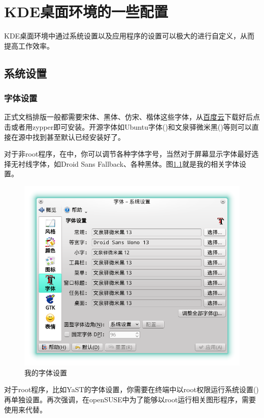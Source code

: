 \chapter{KDE桌面环境的一些配置}
KDE桌面环境中通过系统设置以及应用程序的设置可以极大的进行自定义，从而提高工作效率。
\section{系统设置}
\subsection{字体设置}
正式文档排版一般都需要宋体、黑体、仿宋、楷体这些字体，从\href{http://pan.baidu.com/s/1mgiHWmO}{百度云}下载好后点击或者用zypper即可安装。开源字体如Ubuntu字体()和文泉驿微米黑()等则可以直接在源中找到甚至默认已经安装好了。

对于非root程序，在\me{}中，你可以调节各种字体字号，当然对于屏幕显示字体最好选择无衬线字体，如Droid Sans Fallback、各种黑体。图\ref{myfont}就是我的相关字体设置。
\begin{figure}[htbp!]
 \centering
 \includegraphics[width=\textwidth]{./pic/fontsettings.png}
 \caption{我的字体设置}\label{myfont}
\end{figure}

对于root程序，比如YaST的字体设置，你需要在终端中以root权限运行系统设置()再单独设置。再次强调，在openSUSE中为了能够以root运行相关图形程序，需要使用来代替。


